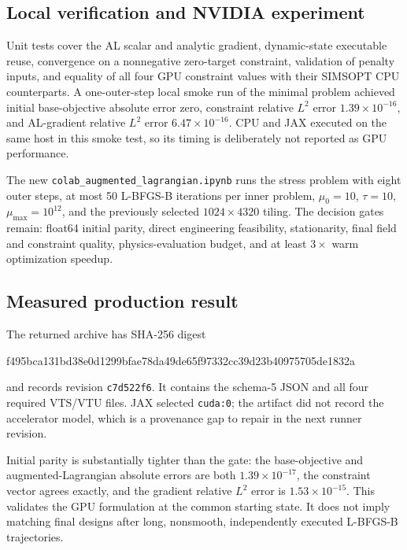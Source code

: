 \documentclass[11pt,a4paper]{article}
\newcommand{\code}[1]{\texttt{#1}}
\begin{document}
\subsection{Local verification and NVIDIA experiment}

Unit tests cover the AL scalar and analytic gradient, dynamic-state executable
reuse, convergence on a nonnegative zero-target constraint, validation of
penalty inputs, and equality of all four GPU constraint values with their
SIMSOPT CPU counterparts.  A one-outer-step local smoke run of the minimal
problem achieved initial base-objective absolute error zero, constraint relative
$L^2$ error $1.39\times10^{-16}$, and AL-gradient relative $L^2$ error
$6.47\times10^{-16}$.  CPU and JAX executed on the same host in this smoke
test, so its timing is deliberately not reported as GPU performance.

The new \code{colab\_augmented\_lagrangian.ipynb} runs the stress problem with
eight outer steps, at most 50 L-BFGS-B iterations per inner problem,
$\mu_0=10$, $\tau=10$, $\mu_{\max}=10^{12}$, and the previously selected
$1024\times4320$ tiling.  The decision gates remain: float64 initial parity,
direct engineering feasibility, stationarity, final field and constraint
quality, physics-evaluation budget, and at least $3\times$ warm optimization
speedup.

\subsection{Measured production result}

The returned archive has SHA-256 digest
\begin{center}
{\scriptsize\ttfamily
f495bca131bd38e0d1299bfae78da49de65f97332cc39d23b40975705de1832a}
\end{center}
and records revision \code{c7d522f6}.  It contains the schema-5 JSON and all
four required VTS/VTU files.  JAX selected \code{cuda:0}; the artifact did not
record the accelerator model, which is a provenance gap to repair in the next
runner revision.

Initial parity is substantially tighter than the gate: the base-objective and
augmented-Lagrangian absolute errors are both $1.39\times10^{-17}$, the
constraint vector agrees exactly, and the gradient relative $L^2$ error is
$1.53\times10^{-15}$.  This validates the GPU formulation at the common
starting state.  It does not imply matching final designs after long,
nonsmooth, independently executed L-BFGS-B trajectories.
\end{document}
